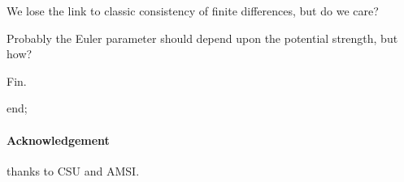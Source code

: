 \documentclass[12pt,a5paper]{article}
\begin{document}
We lose the link to classic consistency of finite differences, but do we care?  

Probably the Euler parameter should depend upon the potential strength, but how?

Fin.
\begin{reduce}
end;
\end{reduce}

\paragraph{Acknowledgement} thanks to CSU and AMSI.



\end{document}
